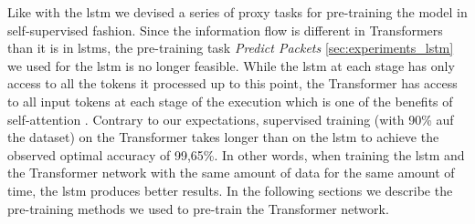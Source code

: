 Like with the \gls{lstm} we devised a series of proxy tasks for pre-training the model in self-supervised fashion. Since the information flow is different in Transformers than it is in \glspl{lstm}, the pre-training task \textit{Predict Packets} \ref{sec:experiments_lstm} we used for the \gls{lstm} is no longer feasible. While the \gls{lstm} at each stage has only access to all the tokens it processed up to this point, the Transformer has access to all input tokens at each stage of the execution which is one of the benefits of self-attention \cite{attention}. Contrary to our expectations, supervised training (with 90\% auf the dataset) on the Transformer takes longer than on the \gls{lstm} to achieve the observed optimal accuracy of 99,65\%. In other words, when training the \gls{lstm} and the Transformer network with the same amount of data for the same amount of time, the \gls{lstm} produces better results. In the following sections we describe the pre-training methods we used to pre-train the Transformer network.

